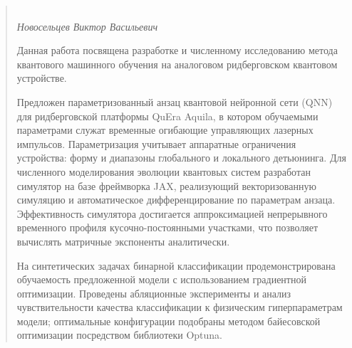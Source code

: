 \begin{abstract}

    \begin{center}
        \large{} \\
    \large\textit{Новосельцев Виктор Васильевич} \\[1 cm]
    \end{center}

Данная работа посвящена разработке и численному исследованию метода квантового машинного обучения
на аналоговом ридберговском квантовом устройстве.

Предложен параметризованный анзац квантовой нейронной сети (QNN) для ридберговской платформы
QuEra Aquila, в котором обучаемыми параметрами служат временные огибающие управляющих лазерных
импульсов. Параметризация учитывает аппаратные ограничения устройства: форму и диапазоны
глобального и локального детьюнинга. Для численного моделирования эволюции квантовых систем 
разработан симулятор на базе фреймворка JAX, реализующий векторизованную
симуляцию и автоматическое дифференцирование по параметрам анзаца.
Эффективность симулятора достигается аппроксимацией непрерывного временного профиля
кусочно-постоянными участками, что позволяет вычислять матричные экспоненты аналитически.

На синтетических задачах бинарной классификации продемонстрирована обучаемость предложенной
модели с использованием градиентной оптимизации. Проведены абляционные эксперименты и анализ
чувствительности качества классификации к физическим гиперпараметрам модели; оптимальные
конфигурации подобраны методом байесовской оптимизации посредством библиотеки Optuna.


\end{abstract}
